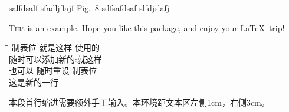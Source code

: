 \documentclass{ctexart}
\begin{document}
salfdsalf
sfadljflajf Fig.~8 sdfsafdsaf
slfdjslafj

\lettrine{T}{his} is an example. Hope you like this package, and enjoy your \LaTeX\ trip!

\begin{tabbing}
\hspace{4em}\=\hspace{8em}\=\kill
制表位 \> 就是这样 \> 使用的 \\
随时\>可以添加\>新的:\=就这样\\
也可以 \= 随时重设 \= 制表位 \\
这是\>新的\>一行
\end{tabbing}

\begin{adjustwidth}{1cm}{3cm}
本段首行缩进需要额外手工输入。本环境距文本区左侧1cm，右侧3cm。
\end{adjustwidth}
\end{document}

